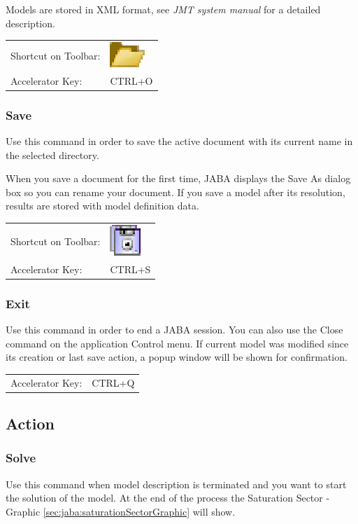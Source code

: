 Models are stored in XML format, see \emph{JMT system manual} for a
detailed description.

\noindent
\begin{tabular}{ll}
Shortcut on Toolbar: & \includegraphics[scale=.8]{img/jaba/open}\\
Accelerator Key: & CTRL+O
\end{tabular}

\subsubsection{Save}
Use this command in order to save the active document with its
current name in the selected directory.

When you save a document for the first time, JABA displays the Save
As dialog box so you can rename your document. If you save a model
after its resolution, results are stored with model definition data.

\noindent
\begin{tabular}{ll}
Shortcut on Toolbar: & \includegraphics[scale=.8]{img/jaba/save}\\
Accelerator Key: & CTRL+S
\end{tabular}

\subsubsection{Exit}
Use this command in order to end a JABA session. You can also use
the Close command on the application Control menu. If current model
was modified since its creation or last save action, a popup window
will be shown for confirmation.

\noindent
\begin{tabular}{ll}
\\
Accelerator Key: & CTRL+Q
\end{tabular}

\subsection{Action}
\subsubsection{Solve}
Use this command when model description is terminated and you want
to start the solution of the model. At the end of the process the
Saturation Sector - Graphic \autoref{sec:jaba:saturationSectorGraphic} will show.

